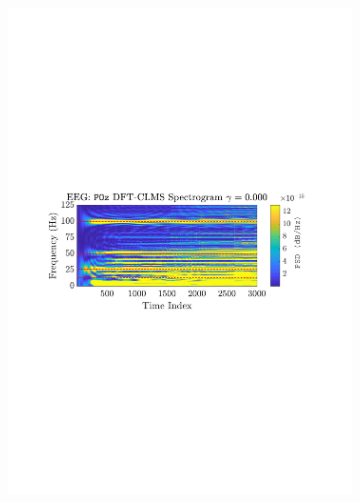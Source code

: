 \documentclass[12pt]{article}
\numberwithin{equation}{section}
\begin{document}
			\begin{figure}[H]
				\centering
				\begin{subfigure}{0.49\textwidth}
					\centering
					\includegraphics[trim={2.2cm 11.2cm 2.90cm  11.2cm}, clip, width=\textwidth]{../MATLAB/figures/q3_3d_fig01.pdf} 
					\captionsetup{justification=centering}
				\end{subfigure}
				\begin{subfigure}{0.49\textwidth}
					\centering

\end{subfigure}
\end{figure}
\end{document}
